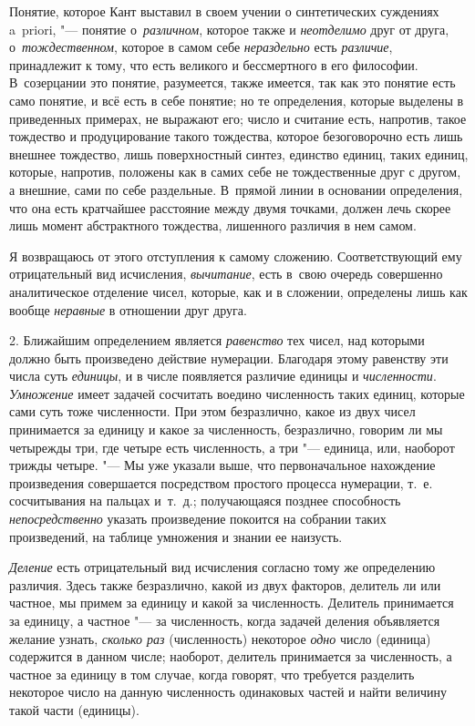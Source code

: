 Понятие, которое Кант выставил в своем учении о синтетических суждениях
a~priori, "--- понятие о~{\em различном}, которое также и {\em неотделимо} друг
от друга, о~{\em тождественном}, которое в самом себе {\em нераздельно} есть
{\em различие}, принадлежит к тому, что есть великого и бессмертного в его
философии. В~созерцании это понятие, разумеется, также имеется, так как это
понятие есть само понятие, и всё есть в себе понятие; но те определения,
которые выделены в приведенных примерах, не выражают его; число и считание
есть, напротив, такое тождество и продуцирование такого тождества, которое
безоговорочно есть лишь внешнее тождество, лишь поверхностный синтез, единство
единиц, таких единиц, которые, напротив, положены как в самих себе не
тождественные друг с другом, а внешние, сами по себе раздельные. В~прямой линии
в основании определения, что она есть кратчайшее расстояние между двумя
точками, должен лечь скорее лишь момент абстрактного тождества, лишенного
различия в нем самом.

Я возвращаюсь от этого отступления к самому сложению. Соответствующий ему
отрицательный вид исчисления, {\em вычитание}, есть в~свою очередь совершенно
аналитическое отделение чисел, которые, как и в сложении, определены лишь как
вообще {\em неравные} в отношении друг друга.

2. Ближайшим определением является {\em равенство} тех чисел, над которыми
должно быть произведено действие нумерации. Благодаря этому равенству эти числа
суть {\em единицы}, и в числе появляется различие единицы и {\em численности}.
{\em Умножение} имеет задачей сосчитать воедино численность таких единиц,
которые сами суть тоже численности. При этом безразлично, какое из двух чисел
принимается за единицу и какое за численность, безразлично, говорим ли мы
четырежды три, где четыре есть численность, а три "--- единица, или, наоборот
трижды четыре. "--- Мы уже указали выше, что первоначальное нахождение
произведения совершается посредством простого процесса нумерации, т.~е.
сосчитывания на пальцах и~т.~д.; получающаяся позднее способность
{\em непосредственно} указать произведение покоится на собрании таких
произведений, на таблице умножения и знании ее наизусть.

{\em Деление} есть отрицательный вид исчисления согласно тому же определению
различия. Здесь также безразлично, какой из двух факторов, делитель ли или
частное, мы примем за единицу и какой за численность. Делитель принимается за
единицу, а частное "--- за численность, когда задачей деления объявляется
желание узнать, {\em сколько раз} (численность) некоторое {\em одно} число
(единица) содержится в данном числе; наоборот, делитель принимается за
численность, а частное за единицу в том случае, когда говорят, что требуется
разделить некоторое число на данную численность одинаковых частей и найти
величину такой части (единицы).

